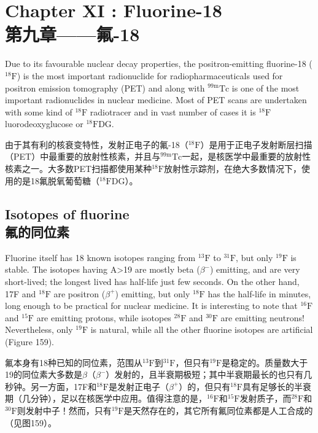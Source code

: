 \documentclass[dvipsnames, svgnames,a4paper,11pt]{article}
\begin{document}
\newpage

\section{Chapter XI : Fluorine-18 \\第九章——氟-18}

Due to its favourable nuclear decay properties, the positron-emitting fluorine-18 (${}^\mathrm{18}\mathrm{F}$)
is the most important radionuclide for radiopharmaceuticals used for positron
emission tomography (PET) and along with \(\mathrm{{}^{99m}Tc}\) is one of the most important
radionuclides in nuclear medicine. Most of PET scans are undertaken with some
kind of ${}^\mathrm{18}\mathrm{F}$ radiotracer and in vast number of cases it is ${}^\mathrm{18}\mathrm{F}$luorodeoxyglucose or
${}^\mathrm{18}\mathrm{F}$DG.

由于其有利的核衰变特性，发射正电子的氟-18（${}^\mathrm{18}\mathrm{F}$）是用于正电子发射断层扫描（PET）中最重要的放射性核素，并且与\(\mathrm{{}^{99m}Tc}\)一起，是核医学中最重要的放射性核素之一。大多数PET扫描都使用某种${}^\mathrm{18}\mathrm{F}$放射性示踪剂，在绝大多数情况下，使用的是18氟脱氧葡萄糖（${}^\mathrm{18}\mathrm{F}$DG）。


\subsection{Isotopes of fluorine \\氟的同位素}
Fluorine itself has 18 known isotopes ranging from ${}^\mathrm{13}\mathrm{F}$ to ${}^\mathrm{31}\mathrm{F}$, but only ${}^\mathrm{19}\mathrm{F}$ is stable.
The isotopes having A>19 are mostly beta ($\beta^{-}$) emitting, and are very short-lived; the
longest lived has half-life just few seconds. On the other hand, 17F and ${}^\mathrm{18}\mathrm{F}$ are
positron ($\beta^{+}$) emitting, but only ${}^\mathrm{18}\mathrm{F}$ has the half-life in minutes, long enough to be
practical for nuclear medicine. It is interesting to note that ${}^\mathrm{16}\mathrm{F}$ and ${}^\mathrm{15}\mathrm{F}$ are emitting
protons, while isotopes ${}^\mathrm{28}\mathrm{F}$ and ${}^\mathrm{30}\mathrm{F}$ are emitting neutrons! Nevertheless, only ${}^\mathrm{19}\mathrm{F}$ is
natural, while all the other fluorine isotopes are artificial (Figure 159).

氟本身有18种已知的同位素，范围从${}^\mathrm{13}\mathrm{F}$到${}^\mathrm{31}\mathrm{F}$，但只有${}^\mathrm{19}\mathrm{F}$是稳定的。质量数大于19的同位素大多数是$\beta$（$\beta^{-}$）发射的，且半衰期极短；其中半衰期最长的也只有几秒钟。另一方面，17F和${}^\mathrm{18}\mathrm{F}$是发射正电子（$\beta^{+}$）的，但只有${}^\mathrm{18}\mathrm{F}$具有足够长的半衰期（几分钟），足以在核医学中应用。值得注意的是，${}^\mathrm{16}\mathrm{F}$和${}^\mathrm{15}\mathrm{F}$发射质子，而${}^\mathrm{28}\mathrm{F}$和${}^\mathrm{30}\mathrm{F}$则发射中子！然而，只有${}^\mathrm{19}\mathrm{F}$是天然存在的，其它所有氟同位素都是人工合成的（见图159）。
\end{document}
